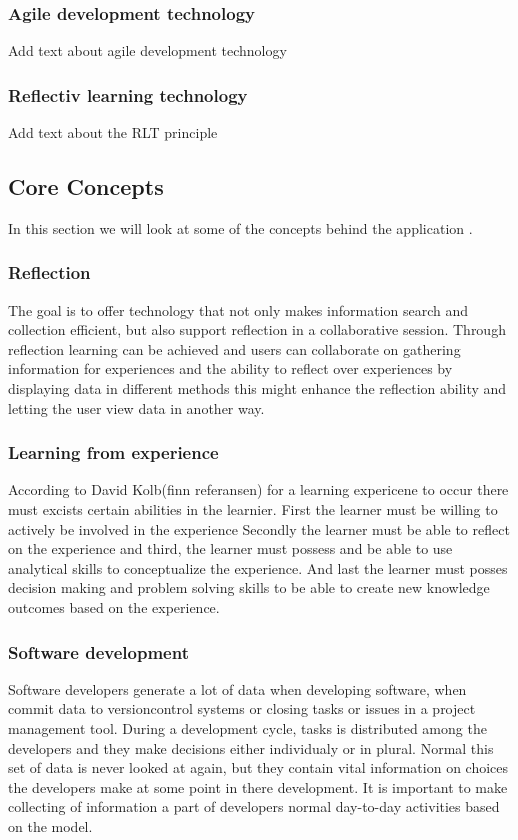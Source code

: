 \subsubsection{Agile development technology}
Add text about agile development technology

\subsubsection{Reflectiv learning technology}
Add text about the RLT principle


\subsection{Core Concepts}
In this section we will look at some of the concepts behind the application	.

\subsubsection{Reflection}
The goal is to offer technology that not only makes information search and collection efficient, but also support reflection in a collaborative session. Through reflection learning can be achieved and users can collaborate on gathering information for experiences and the ability to reflect over experiences by displaying data in different methods this might enhance the reflection ability and letting the user view data in another way.

\subsubsection{Learning from experience}
According to David Kolb(finn referansen) for a learning expericene to occur there must excists certain abilities in the learnier. First the learner must be willing to actively be involved in the experience Secondly the learner must be able to reflect on the experience and third, the learner must possess and be able to use analytical skills to conceptualize the experience. And last the learner must posses decision making and problem solving skills to be able to create new knowledge outcomes based on the experience.

\subsubsection{Software development}
Software developers generate a lot of data when developing software, when commit data to versioncontrol systems or closing tasks or issues in a project management tool. During a development cycle, tasks is distributed among the developers and they make decisions either individualy or in plural. Normal this set of data is never looked at again, but they contain vital information on choices the developers make at some point in there development. It is important to make collecting of information a part of developers normal day-to-day activities based on the model\cite{Krogstie2009}.

